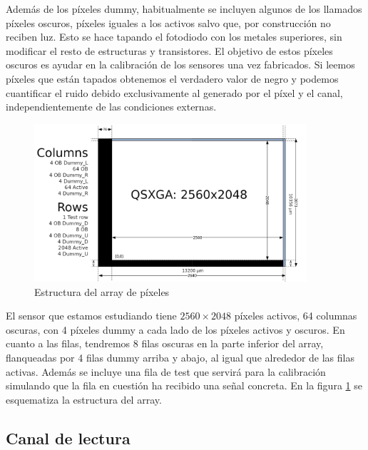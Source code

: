 Además de los píxeles dummy, habitualmente se incluyen algunos de los llamados
píxeles oscuros, píxeles iguales a los activos salvo que, por construcción no
reciben luz. Esto se hace tapando el fotodiodo con los metales superiores,
sin modificar el resto de estructuras y transistores. El objetivo de estos píxeles
oscuros es ayudar en la calibración de los sensores una vez fabricados. Si
leemos píxeles que están tapados obtenemos el verdadero valor de negro y podemos
cuantificar el ruido debido exclusivamente al generado por el píxel y el canal,
independientemente de las condiciones externas.\\

\begin{figure}[h]
	\centering
	\includegraphics[width=0.9\textwidth]{img/pixel_array.png}
	\caption{Estructura del array de píxeles\protect\footnotemark}
	\label{fig:pxa_array}
\end{figure}

El sensor que estamos estudiando tiene $2560\times2048$ píxeles activos, 64 columnas
oscuras, con 4 píxeles dummy a cada lado de los píxeles activos y oscuros.
En cuanto a las filas, tendremos 8 filas oscuras en la parte inferior del array,
flanqueadas por 4 filas dummy arriba y abajo, al igual que alrededor de las filas
activas. Además se incluye una fila de test que servirá para la calibración simulando
que la fila en cuestión ha recibido una señal concreta. En la figura
\ref{fig:pxa_array} se esquematiza la estructura del array.\\

\subsection{Canal de lectura}

